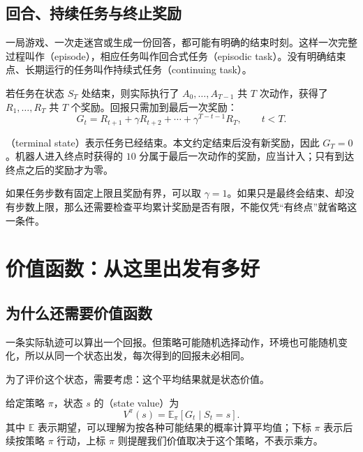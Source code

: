 \documentclass[UTF8]{ctexart}
\begin{document}
\subsection{回合、持续任务与终止奖励}

一局游戏、一次走迷宫或生成一份回答，都可能有明确的结束时刻。这样一次完整过程叫作（episode），相应任务叫作回合式任务（episodic task）。没有明确结束点、长期运行的任务叫作持续式任务（continuing task）。

若任务在状态 $S_T$ 处结束，则实际执行了 $A_0,\ldots,A_{T-1}$ 共 $T$ 次动作，获得了 $R_1,\ldots,R_T$ 共 $T$ 个奖励。回报只需加到最后一次奖励：
\begin{equation}
  G_t=R_{t+1}+\gamma R_{t+2}+\cdots+\gamma^{T-t-1}R_T,
  \qquad t<T.
  \label{eq:mdp-finite-return}
\end{equation}

（terminal state）表示任务已经结束。本文约定结束后没有新奖励，因此 $G_T=0$。机器人进入终点时获得的 $10$ 分属于最后一次动作的奖励，应当计入；只有到达终点之后的奖励才为零。

如果任务步数有固定上限且奖励有界，可以取 $\gamma=1$。如果只是最终会结束、却没有步数上限，那么还需要检查平均累计奖励是否有限，不能仅凭“有终点”就省略这一条件。

\section{价值函数：从这里出发有多好}
\label{sec:mdp-value}

\subsection{为什么还需要价值函数}

一条实际轨迹可以算出一个回报。但策略可能随机选择动作，环境也可能随机变化，所以从同一个状态出发，每次得到的回报未必相同。

为了评价这个状态，需要考虑：这个平均结果就是状态价值。

\begin{definition}[状态价值函数]
给定策略 $\pi$，状态 $s$ 的（state value）为
\begin{equation}
  V^\pi(s)=\mathbb E_\pi[G_t\mid S_t=s].
  \label{eq:mdp-state-value}
\end{equation}
其中 $\mathbb E$ 表示期望，可以理解为按各种可能结果的概率计算平均值；下标 $\pi$ 表示后续按策略 $\pi$ 行动，上标 $\pi$ 则提醒我们价值取决于这个策略，不表示乘方。
\end{definition}
\end{document}
